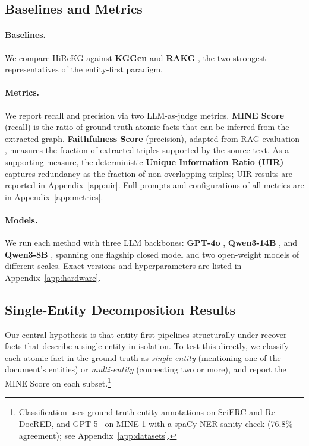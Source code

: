 \documentclass[11pt]{article}
\begin{document}
\subsection{Baselines and Metrics}
\label{sec:baselines}
\paragraph{Baselines.} We compare HiReKG against \textbf{KGGen} \citep{kggen} and \textbf{RAKG} \citep{rakg}, the two strongest representatives of the entity-first paradigm.
\paragraph{Metrics.} We report recall and precision via two LLM-as-judge metrics. \textbf{MINE Score} \citep{kggen} (recall) is the ratio of ground truth atomic facts that can be inferred from the extracted graph. \textbf{Faithfulness Score} (precision), adapted from RAG evaluation \citep{ragas}, measures the fraction of extracted triples supported by the source text. As a supporting measure, the deterministic \textbf{Unique Information Ratio (UIR)} captures redundancy as the fraction of non-overlapping triples; UIR results are reported in Appendix~\ref{app:uir}. Full prompts and configurations of all metrics are in Appendix~\ref{app:metrics}.
\paragraph{Models.} We run each method with three LLM backbones: \textbf{GPT-4o} \citep{gpt4o}, \textbf{Qwen3-14B} \citep{qwen3_14b}, and \textbf{Qwen3-8B} \citep{qwen3_8b}, spanning one flagship closed model and two open-weight models of different scales. Exact versions and hyperparameters are listed in Appendix~\ref{app:hardware}.



\subsection{Single-Entity Decomposition Results}
\label{sec:single-entity}
Our central hypothesis is that entity-first pipelines structurally under-recover facts that describe a single entity in isolation. To test this directly, we classify each atomic fact in the ground truth as \emph{single-entity} (mentioning one of the document's entities) or \emph{multi-entity} (connecting two or more), and report the MINE Score on each subset.\footnote{Classification uses ground-truth entity annotations on SciERC and Re-DocRED, and GPT-5~\citep{gpt5} on MINE-1 with a spaCy NER sanity check (76.8\% agreement); see Appendix~\ref{app:datasets}.}
\end{document}
